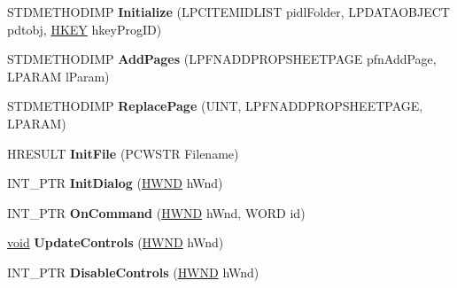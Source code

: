 \begin{DoxyCompactItemize}
\item 
\mbox{\label{class_c_layer_u_i_prop_page_a61fbb93c458d98cd1c72cda79f17337f}} 
S\+T\+D\+M\+E\+T\+H\+O\+D\+I\+MP {\bfseries Initialize} (L\+P\+C\+I\+T\+E\+M\+I\+D\+L\+I\+ST pidl\+Folder, L\+P\+D\+A\+T\+A\+O\+B\+J\+E\+CT pdtobj, \hyperlink{interfacevoid}{H\+K\+EY} hkey\+Prog\+ID)
\item 
\mbox{\label{class_c_layer_u_i_prop_page_aff72b979fb7a03828b6c4ae31f36d8a0}} 
S\+T\+D\+M\+E\+T\+H\+O\+D\+I\+MP {\bfseries Add\+Pages} (L\+P\+F\+N\+A\+D\+D\+P\+R\+O\+P\+S\+H\+E\+E\+T\+P\+A\+GE pfn\+Add\+Page, L\+P\+A\+R\+AM l\+Param)
\item 
\mbox{\label{class_c_layer_u_i_prop_page_abe5a613e39a8c368ec2ed6fa82b25a88}} 
S\+T\+D\+M\+E\+T\+H\+O\+D\+I\+MP {\bfseries Replace\+Page} (U\+I\+NT, L\+P\+F\+N\+A\+D\+D\+P\+R\+O\+P\+S\+H\+E\+E\+T\+P\+A\+GE, L\+P\+A\+R\+AM)
\item 
\mbox{\label{class_c_layer_u_i_prop_page_a821964bc60865202eae29cff23025a7b}} 
H\+R\+E\+S\+U\+LT {\bfseries Init\+File} (P\+C\+W\+S\+TR Filename)
\item 
\mbox{\label{class_c_layer_u_i_prop_page_a1489520a76d554fdb0c243226c938c37}} 
I\+N\+T\+\_\+\+P\+TR {\bfseries Init\+Dialog} (\hyperlink{interfacevoid}{H\+W\+ND} h\+Wnd)
\item 
\mbox{\label{class_c_layer_u_i_prop_page_a5c0b03e0fbf96657510f158484feede2}} 
I\+N\+T\+\_\+\+P\+TR {\bfseries On\+Command} (\hyperlink{interfacevoid}{H\+W\+ND} h\+Wnd, W\+O\+RD id)
\item 
\mbox{\label{class_c_layer_u_i_prop_page_aba2f1c9e64083d41fbe9162b799f37af}} 
\hyperlink{interfacevoid}{void} {\bfseries Update\+Controls} (\hyperlink{interfacevoid}{H\+W\+ND} h\+Wnd)
\item 
\mbox{\label{class_c_layer_u_i_prop_page_a46b38c5e75d6a2fdb32b693ace986696}} 
I\+N\+T\+\_\+\+P\+TR {\bfseries Disable\+Controls} (\hyperlink{interfacevoid}{H\+W\+ND} h\+Wnd)

\end{DoxyCompactItemize}
